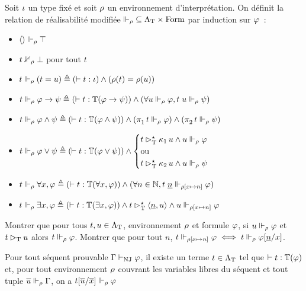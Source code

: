 \begin{definition}
  Soit $\iota$ un type fixé et soit $\rho$ un environnement
  d'interprétation. On définit la relation de réalisabilité modifiée
  $\mathord{\Vdash_\rho}\subseteq\Lambda_{\mathrm{T}}\times\operatorname{Form}$ par induction sur
  $\varphi$~:
  \begin{itemize}
  \item $\langle\rangle\Vdash_\rho \top$
  \item $t\nVdash_\rho\bot$ pour tout $t$
  \item $t\Vdash_\rho (t = u) \triangleq (\mathrel{\vdash} t : \iota) \land
    (\rho(t) = \rho(u))$
  \item $t\Vdash_\rho \varphi \to \psi \triangleq
    (\mathrel{\vdash} t : \mathbb{T}(\varphi \to \psi))\land(\forall u \Vdash_\rho \varphi,
    t\;u\Vdash_\rho \psi)$
  \item $t\Vdash_\rho\varphi\land\psi \triangleq
    (\mathrel{\vdash} t : \mathbb{T}(\varphi\land\psi))\land
    (\mathop{\pi_{1}^{}} t \Vdash_\rho\varphi)\land(\mathop{\pi_{2}^{}} t \Vdash_\rho \psi)$
  \item $t\Vdash_\rho\varphi\lor\psi \triangleq
    (\mathrel{\vdash} t : \mathbb{T}(\varphi\lor\psi))\land\begin{cases}
    t\rhd_{\mathrm{T}}^{\mathord{\star}} \mathop{\kappa_{1}}u \land u\Vdash_\rho \varphi\\
    \text{ou}\\
    t\rhd_{\mathrm{T}}^{\mathord{\star}}\mathop{\kappa_{2}} u \land u \Vdash_\rho \psi
  \end{cases}$
  \item $t\Vdash_\rho\forall x, \varphi \triangleq
    (\mathrel{\vdash} t : \mathbb{T}(\forall x, \varphi))\land(\forall n \in \mathbb N,
    t\;\underline{n} \Vdash_{\rho[x \mapsto n]} \varphi)$
  \item $t\Vdash_\rho\exists x, \varphi \triangleq
    (\mathrel{\vdash} t : \mathbb{T}(\exists x, \varphi))\land
    t\rhd_{\mathrm{T}}^{\mathord{\star}} \langle \underline{n}, u\rangle \land
    u\Vdash_{\rho[x \mapsto n]} \varphi$
  \end{itemize}
\end{definition}

\begin{exercise}
  Montrer que pour tous $t,u \in \Lambda_{\mathrm{T}}$, environnement $\rho$ et
  formule $\varphi$, si $u \Vdash_\rho \varphi$ et $t \rhd_{\mathrm{T}} u$ alors
  $t\Vdash_\rho \varphi$. Montrer que pour tout $n$,
  $t\Vdash_{\rho[x\mapsto n]} \varphi\iff t\Vdash_\rho\varphi[\underline{n}/x]$.
\end{exercise}

\begin{lemma}[Adéquation]
  Pour tout séquent prouvable $\Gamma\vdash_{\operatorname{NJ}}\varphi$, il existe un terme
  $t \in \Lambda_{\mathrm{T}}$ tel que $\mathrel{\vdash} t : \mathbb{T}(\varphi)$ et, pour tout
  environnement $\rho$ couvrant les variables libres du séquent et tout
  tuple $\overline{u} \Vdash_\rho \Gamma$, on a
  $t[\overline{u}/\overline{x}] \Vdash_\rho \varphi$
\end{lemma}

